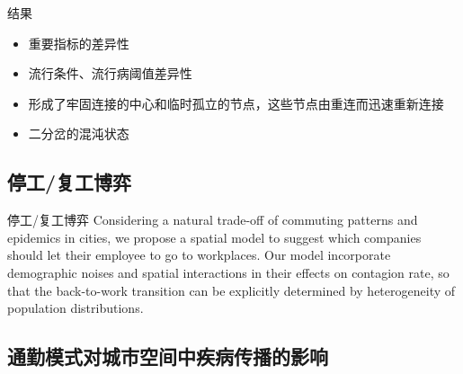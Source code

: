 \begin{frame}{结果}
    \begin{itemize}
        \item 重要指标的差异性 \vspace{0.5cm}
        \item 流行条件、流行病阈值差异性\vspace{0.5cm}
        \item 形成了牢固连接的中心和临时孤立的节点，这些节点由重连而迅速重新连接\vspace{0.5cm}
        \item 二分岔的混沌状态\vspace{0.5cm}
    \end{itemize}
\end{frame}



\subsection{停工/复工博弈}
\begin{frame}{停工/复工博弈}
    Considering  a  natural  trade-off  of  commuting  patterns  and  epidemics  in  cities,  we  propose a spatial model to suggest which companies should let their employee to go to workplaces.  Our model incorporate demographic noises and spatial interactions in their effects on contagion rate, so that the back-to-work transition can be explicitly determined by heterogeneity of population distributions.
\end{frame}

\subsection{通勤模式对城市空间中疾病传播的影响}

